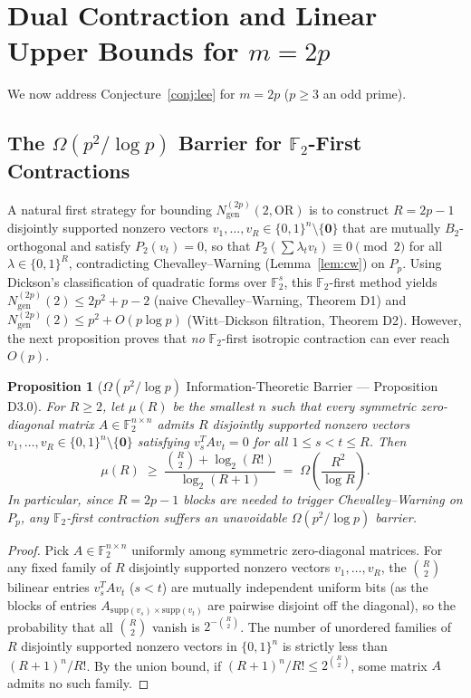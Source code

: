 \documentclass[11pt,a4paper]{article}
\newtheorem{proposition}[theorem]{Proposition}
\theoremstyle{definition}
\newcommand{\F}{\mathbb{F}}
\newcommand{\OR}{\mathrm{OR}}
\newcommand{\Ngen}{N_{\mathrm{gen}}}
\newcommand{\supp}{\mathrm{supp}}
\begin{document}
\section{Dual Contraction and Linear Upper Bounds for $m = 2p$}
\label{sec:linear2p}

We now address Conjecture~\ref{conj:lee} for $m = 2p$ ($p \ge 3$ an odd prime).

\subsection{The $\Omega(p^2 / \log p)$ Barrier for $\F_2$-First Contractions}

A natural first strategy for bounding $\Ngen^{(2p)}(2, \OR)$ is to construct $R = 2p - 1$ disjointly supported nonzero vectors $v_1,\dots,v_R \in \{0,1\}^n \setminus \{\mathbf{0}\}$ that are mutually $B_2$-orthogonal and satisfy $P_2(v_t) = 0$, so that $P_2(\sum \lambda_t v_t) \equiv 0 \pmod 2$ for all $\lambda \in \{0,1\}^R$, contradicting Chevalley--Warning (Lemma~\ref{lem:cw}) on $P_p$. Using Dickson's classification of quadratic forms over $\F_2^s$, this $\F_2$-first method yields $\Ngen^{(2p)}(2) \le 2p^2 + p - 2$ (naive Chevalley--Warning, Theorem D1) and $\Ngen^{(2p)}(2) \le p^2 + O(p \log p)$ (Witt--Dickson filtration, Theorem D2). However, the next proposition proves that \emph{no} $\F_2$-first isotropic contraction can ever reach $O(p)$.

\begin{proposition}[$\Omega(p^2 / \log p)$ Information-Theoretic Barrier --- Proposition D3.0]
\label{prop:d30}
For $R \ge 2$, let $\mu(R)$ be the smallest $n$ such that every symmetric zero-diagonal matrix $A \in \F_2^{n \times n}$ admits $R$ disjointly supported nonzero vectors $v_1,\dots,v_R \in \{0,1\}^n \setminus \{\mathbf{0}\}$ satisfying $v_s^T A v_t = 0$ for all $1 \le s < t \le R$. Then
\[
  \mu(R) \;\ge\; \frac{\binom{R}{2} + \log_2(R!)}{\log_2(R + 1)} \;=\; \Omega\!\left(\frac{R^2}{\log R}\right).
\]
In particular, since $R = 2p - 1$ blocks are needed to trigger Chevalley--Warning on $P_p$, any $\F_2$-first contraction suffers an unavoidable $\Omega(p^2 / \log p)$ barrier.
\end{proposition}

\begin{proof}
Pick $A \in \F_2^{n \times n}$ uniformly among symmetric zero-diagonal matrices. For any fixed family of $R$ disjointly supported nonzero vectors $v_1,\dots,v_R$, the $\binom{R}{2}$ bilinear entries $v_s^T A v_t$ ($s < t$) are mutually independent uniform bits (as the blocks of entries $A_{\supp(v_s) \times \supp(v_t)}$ are pairwise disjoint off the diagonal), so the probability that all $\binom{R}{2}$ vanish is $2^{-\binom{R}{2}}$. The number of unordered families of $R$ disjointly supported nonzero vectors in $\{0,1\}^n$ is strictly less than $(R+1)^n / R!$. By the union bound, if $(R+1)^n / R! \le 2^{\binom{R}{2}}$, some matrix $A$ admits no such family.
\end{proof}
\end{document}
